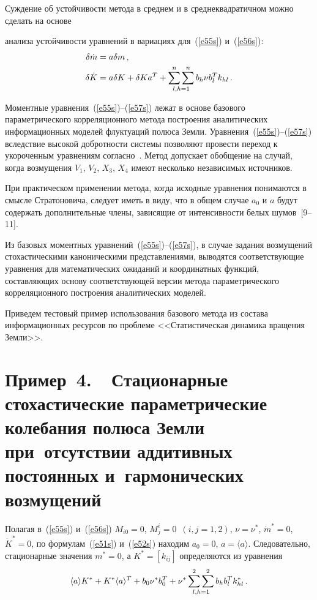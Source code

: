 \begin{multicols}{2}
Суждение об устойчивости метода в среднем и в среднеквадратичном
можно сделать на основе\linebreak
\pagebreak

\noindent
 анализа устойчивости уравнений в вариациях
для~(\ref{e55s}) и~(\ref{e56s}):
\begin{align*}
\delta \dot m &= a \delta m\,,\\ %
\delta \dot K &= a \delta K +\delta K a^T +\sssn\limits_{l,h=1} b_h \nu b_l^T k_{hl}\,.
\end{align*}

Моментные уравнения~(\ref{e55s})--(\ref{e57s}) лежат в основе базового
параметрического корреляционного метода построения аналитических
информационных моделей флуктуаций полюса Земли. Уравнения~(\ref{e55s})--(\ref{e57s})
вследствие высокой добротности системы позволяют провести
переход к укороченным уравнениям согласно~\cite{22s}. Метод допускает
обобщение на случай, когда возмущения $V_1$, $V_2$, $X_3$, $X_4$ имеют
несколько независимых источников.
{

}
При практическом применении метода, когда исходные уравнения
понимаются в смысле Стратоновича, следует иметь в виду, что в
общем случае $a_0$ и $a$ будут содержать дополнительные члены,
зависящие от интенсивности белых шумов~[9--11]. %

Из базовых моментных уравнений~(\ref{e55s})--(\ref{e57s}), в случае задания
возмущений стохастическими каноническими представлениями, выводятся
соответствующие уравнения для математических ожиданий и координатных
функций, составляющих основу соответствующей версии метода
параметрического корреляционного построения аналитических моделей.

Приведем тестовый пример использования базового метода из состава
информационных ресурсов по проблеме <<Статистическая динамика
вращения Земли>>.


\section{Пример~4.\ \ Стационарные стохастические параметрические колебания полюса Земли
при~отсутствии аддитивных постоянных и~гармонических возмущений} %


Полагая в~(\ref{e55s}) и~(\ref{e56s}) $M_{i0} =0$, $ M_j^i =0$\ $(i,j=1,2)$,
$ \nu=\nu^*$, $ \dot m^* =0$, $ \dot K^* =0$, по формулам~(\ref{e51s}) и~(\ref{e52s})
находим $a_0=0$, $ a=\langle a\rangle$. Следовательно,
стационарные значения $m^*=0$, а $K^*=[k_{ij}]$ определяются из
уравнения
\begin{equation*}
\langle a\rangle K^* + K^* \langle a\rangle^T + b_0\nu^* b_0^T +\nu^*
 \mathop{\sum\limits^2\sum\limits^2}\limits_{l,h=1} b_h b_l^T k_{hl}^*\,.
 \end{equation*}



\end{multicols}
